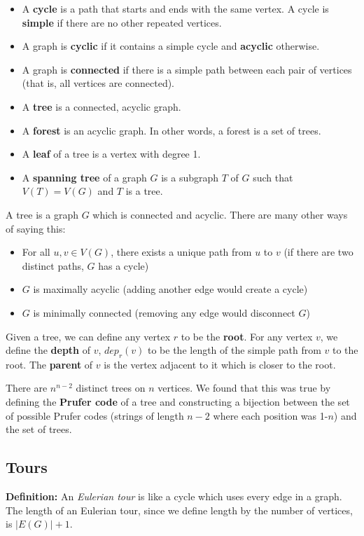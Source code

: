 \documentclass[12pt,letterpaper]{article}
\newcommand\definition{\textbf{Definition: }}
\begin{document}
\begin{itemize}
    \item A \textbf{cycle} is a path that starts and ends with the same vertex. A cycle is \textbf{simple} if there are no other repeated vertices.
    \item A graph is \textbf{cyclic} if it contains a simple cycle and \textbf{acyclic} otherwise.
    \item A graph is \textbf{connected} if there is a simple path between each pair of vertices (that is, all vertices are connected).
    \item A \textbf{tree} is a connected, acyclic graph.
    \item A \textbf{forest} is an acyclic graph. In other words, a forest is a set of trees.
    \item A \textbf{leaf} of a tree is a vertex with degree 1.
    \item A \textbf{spanning tree} of a graph $G$ is a subgraph $T$ of $G$ such that $V(T) = V(G)$ and $T$ is a tree.
\end{itemize}

A tree is a graph $G$ which is connected and acyclic. There are many other ways of saying this:
\begin{itemize}
    \item For all $u,v \in V(G)$, there exists a unique path from $u$ to $v$ (if there are two distinct paths, $G$ has a cycle)
    \item $G$ is maximally acyclic (adding another edge would create a cycle)
    \item $G$ is minimally connected (removing any edge would disconnect $G$)
\end{itemize}

Given a tree, we can define any vertex $r$ to be the \textbf{root}. For any vertex $v$, we define the \textbf{depth} of $v$, $dep_r(v)$ to be the length of the simple path from $v$ to the root. The \textbf{parent} of $v$ is the vertex adjacent to it which is closer to the root.

There are $n^{n-2}$ distinct trees on $n$ vertices. We found that this was true by defining the \textbf{Prufer code} of a tree and constructing a bijection between the set of possible Prufer codes (strings of length $n-2$ where each position was 1-$n$) and the set of trees.

\subsection{Tours}
\definition  An \emph{Eulerian tour} is like a cycle which uses every edge in a graph. The length of an Eulerian tour, since we define length by the number of vertices, is $|E(G)|+1$.
\end{document}
